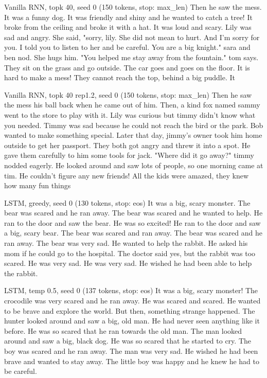 \begin{modelout}{Vanilla RNN, topk 40, seed 0 (150 tokens, stop: max\_len)}
\small Then he saw the mess. It was a funny dog. It was friendly and shiny and he wanted to catch a tree! It broke from the ceiling and broke it with a hat. It was loud and scary. Lily was sad and angry. She said, "sorry, lily. She did not mean to hurt. And I'm sorry for you. I told you to listen to her and be careful. You are a big knight." sara and ben nod. She hugs him. "You helped me stay away from the fountain." tom says. They sit on the grass and go outside. The car goes and goes on the floor. It is hard to make a mess! They cannot reach the top, behind a big puddle. It
\end{modelout}

\begin{modelout}{Vanilla RNN, topk 40 rep1.2, seed 0 (150 tokens, stop: max\_len)}
\small Then he saw the mess his ball back when he came out of him. Then, a kind fox named sammy went to the store to play with it. Lily was curious but timmy didn't know what you needed. Timmy was sad because he could not reach the bird or the park. Bob wanted to make something special. Later that day, jimmy's owner took him home outside to get her passport. They both got angry and threw it into a spot. He gave them carefully to him some tools for jack. "Where did it go away?" timmy nodded eagerly. He looked around and saw lots of people, so one morning came at tim. He couldn't figure any new friends! All the kids were amazed, they knew how many fun things
\end{modelout}

\begin{modelout}{LSTM, greedy, seed 0 (130 tokens, stop: eos)}
\small It was a big, scary monster. The bear was scared and he ran away. The bear was scared and he wanted to help. He ran to the door and saw the bear. He was so excited! He ran to the door and saw a big, scary bear. The bear was scared and ran away. The bear was scared and he ran away. The bear was very sad. He wanted to help the rabbit. He asked his mom if he could go to the hospital. The doctor said yes, but the rabbit was too scared. He was very sad. He was very sad. He wished he had been able to help the rabbit.
\end{modelout}

\begin{modelout}{LSTM, temp 0.5, seed 0 (137 tokens, stop: eos)}
\small It was a big, scary monster! The crocodile was very scared and he ran away. He was scared and scared. He wanted to be brave and explore the world. But then, something strange happened. The hunter looked around and saw a big, old man. He had never seen anything like it before. He was so scared that he ran towards the old man. The man looked around and saw a big, black dog. He was so scared that he started to cry. The boy was scared and he ran away. The man was very sad. He wished he had been brave and wanted to stay away. The little boy was happy and he knew he had to be careful.
\end{modelout}

